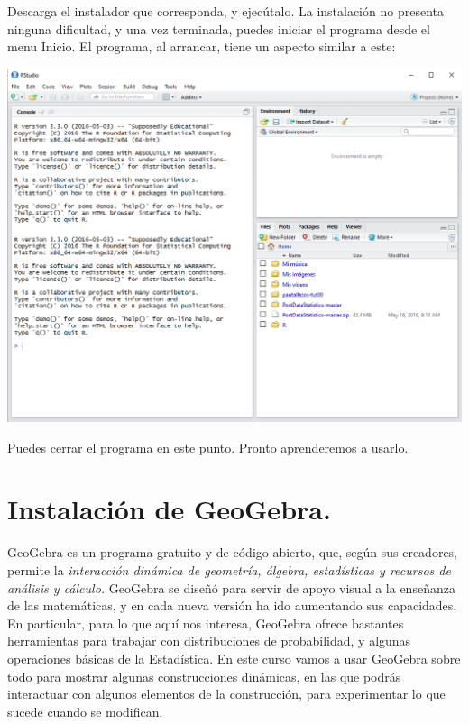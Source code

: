 \documentclass[10pt,a4paper]{article}\usepackage[]{graphicx}\usepackage[]{color}
\begin{document}
Descarga el instalador que corresponda, y ejecútalo. La instalación no presenta ninguna dificultad,
y una vez terminada, puedes iniciar el programa desde el menu Inicio. El programa, al arrancar,
tiene un aspecto similar a este:
    \begin{center}
    \includegraphics[width=15cm]{../fig/Tut00-44.png}
    \end{center}
Puedes cerrar el programa en este punto. Pronto aprenderemos a usarlo.


\section{Instalación de GeoGebra.}
\label{tut00:sec:InstalacionGeoGebra}

GeoGebra  es un programa gratuito y de código abierto, que, según sus creadores, permite la {\em
interacción dinámica de geometría, álgebra, estadísticas y recursos de análisis y cálculo.}
GeoGebra  se diseñó para servir de apoyo visual a la enseñanza de las matemáticas, y en cada nueva
versión ha ido aumentando sus capacidades. En particular, para lo que aquí nos interesa,  GeoGebra
ofrece bastantes herramientas para trabajar con distribuciones de probabilidad, y algunas
operaciones básicas de la Estadística. En este curso vamos a usar  GeoGebra  sobre todo para
mostrar algunas construcciones dinámicas, en las que podrás interactuar con algunos elementos de la
construcción, para experimentar lo que sucede cuando se modifican.
\end{document}
